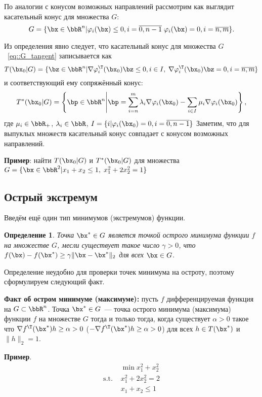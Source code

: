 \documentclass[12pt]{article}
\newtheorem{Def}{Определение}
\begin{document}
По аналогии с конусом возможных направлений рассмотрим как выглядит касательный конус для множества $G$:
\begin{equation}
G = \{\bx \in \bbR^n | \varphi_i(\bx) \leq 0, i = \overline{0, n-1} \; \varphi_i(\bx) = 0, i = \overline{n, m} \}.
\label{eq::G_tangent}
\end{equation}

Из определения явно следует, что касательный конус для множества $G$~\eqref{eq::G_tangent} записывается как
\[
T(\bx_0|G) = \{ \bz \in \bbR^n | \nabla \varphi^{\T}_i(\bx_0)\bz \leq 0, i \in I, \; \nabla \varphi^{\T}_i(\bx_0)\bz = 0, i = \overline{n,m} \}
\]
и соответствующий ему сопряжённый конус:
\[
T^*(\bx_0|G) = \left \{ \bp \in \bbR^n \middle| \bp = \sum\limits_{i = n}^m \lambda_i \nabla \varphi_i(\bx_0) - \sum\limits_{i \in I} \mu_i \nabla \varphi_i(\bx_0) \right \},
\] 
где $\mu_i \in \bbR_+$, $\lambda_i \in \bbR$, $I = \{i | \varphi_i(\bx_0) = 0, i = \overline{0, n-1} \}$
Заметим, что для выпуклых множеств касательный конус совпадает с конусом возможных направлений.

\textbf{Пример}: найти $T(\bx_0|G)$ и $T^*(\bx_0|G)$ для множества $G = \{\bx \in \bbR^2 | x_1 + x_2 \leq 1, \; x^2_1 + 2x_2^2 = 1 \}$


\subsection{Острый экстремум}

Введём ещё один тип минимумов (экстремумов) функции.
\begin{Def}
Точка $\bx^* \in G$ является точкой острого минимума функции $f$ на множестве $G$, месли существует такое число $\gamma > 0$, что $f(\bx) - f(\bx^*) \geq \gamma \|\bx - \bx^*\|_2$ для всех $\bx \in G$.
\end{Def}

Определение неудобно для проверки точек минимума на остроту, поэтому сформулируем следующий факт.

\textbf{Факт об остром минимуме (максимуме):} пусть $f$ дифференцируемая функция на $G \subset \bbR^n$. 
Точка $\bx^* \in G$~--- точка острого минимума (максимума) функции $f$ на множестве $G$ тогда и только тогда, когда существует $\alpha > 0$ такое что $\nabla f^{\T}(\bx^*) h \geq \alpha > 0$ ($-\nabla f^{\T}(\bx^*) h \geq \alpha > 0$) для всех $h \in T(\bx^*)$ и $\|h\|_2 = 1$.  

\textbf{Пример}.
\begin{equation}
\begin{split}
& \min x_1^2 + x_2^2\\
\text{s.t. } & x_1^2 + 2x_2^2 = 2\\
& x_1 + x_2 \leq 1
\end{split}
\label{eq::sharp_extr}
\end{equation}
\end{document}
